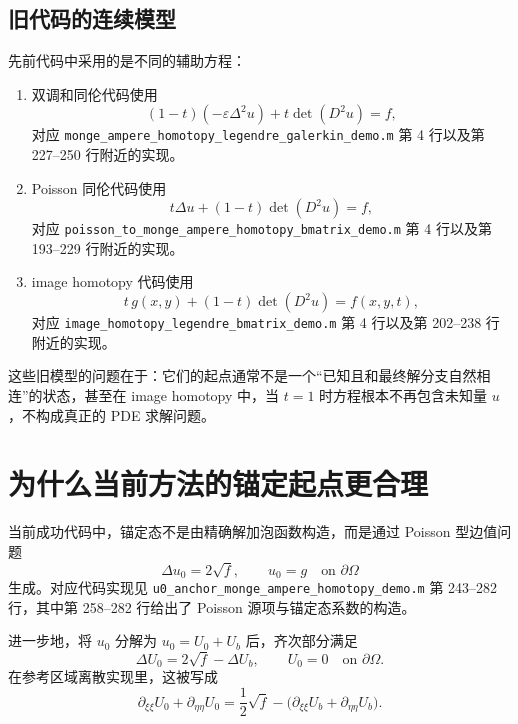 \documentclass[11pt,a4paper]{article}
\begin{document}
\subsection{旧代码的连续模型}
先前代码中采用的是不同的辅助方程：
\begin{enumerate}[leftmargin=2em]
\item 双调和同伦代码使用
\begin{equation}
(1-t)(-\varepsilon \Delta^2u)+t\det(D^2u)=f,
\label{eq:old_biharm}
\end{equation}
对应 \texttt{monge\_ampere\_homotopy\_legendre\_galerkin\_demo.m} 第 4 行以及第 227--250 行附近的实现。

\item Poisson 同伦代码使用
\begin{equation}
t\Delta u+(1-t)\det(D^2u)=f,
\label{eq:old_poisson}
\end{equation}
对应 \texttt{poisson\_to\_monge\_ampere\_homotopy\_bmatrix\_demo.m} 第 4 行以及第 193--229 行附近的实现。

\item image homotopy 代码使用
\begin{equation}
t\,g(x,y)+(1-t)\det(D^2u)=f(x,y,t),
\label{eq:old_image}
\end{equation}
对应 \texttt{image\_homotopy\_legendre\_bmatrix\_demo.m} 第 4 行以及第 202--238 行附近的实现。
\end{enumerate}

这些旧模型的问题在于：它们的起点通常不是一个“已知且和最终解分支自然相连”的状态，甚至在 image homotopy 中，当 $t=1$ 时方程根本不再包含未知量 $u$，不构成真正的 PDE 求解问题。

\section{为什么当前方法的锚定起点更合理}
当前成功代码中，锚定态不是由精确解加泡函数构造，而是通过 Poisson 型边值问题
\begin{equation}
\Delta u_0 = 2\sqrt{f},
\qquad
u_0=g \quad \text{on }\partial\Omega
\label{eq:anchor_poisson}
\end{equation}
生成。对应代码实现见 \texttt{u0\_anchor\_monge\_ampere\_homotopy\_demo.m} 第 243--282 行，其中第 258--282 行给出了 Poisson 源项与锚定态系数的构造。

进一步地，将 $u_0$ 分解为 $u_0=U_0+U_b$ 后，齐次部分满足
\[
\Delta U_0 = 2\sqrt{f}-\Delta U_b,
\qquad
U_0=0 \quad \text{on }\partial\Omega.
\]
在参考区域离散实现里，这被写成
\[
\partial_{\xi\xi}U_0+\partial_{\eta\eta}U_0
=
\frac{1}{2}\sqrt{f}-\bigl(\partial_{\xi\xi}U_b+\partial_{\eta\eta}U_b\bigr).
\]
\end{document}
